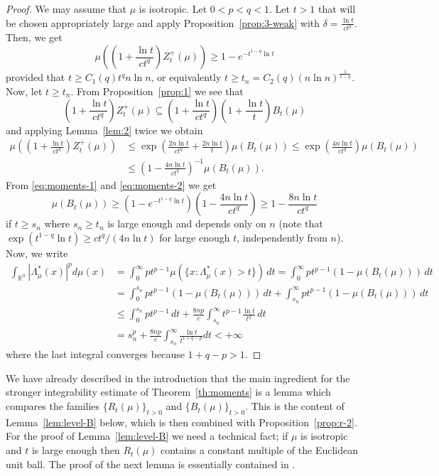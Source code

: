 \documentclass[11pt,leqno]{article}
\theoremstyle{definition}
\theoremstyle{remark}
\numberwithin{equation}{section}
\newcommand{\ls}{\leqslant}
\newcommand{\gr}{\geqslant}
\newcommand{\1}{\textbf{1}}
\begin{document}
\begin{proof}We may assume that $\mu$ is isotropic. Let $0<p<q<1$. Let $t>1$ that will be chosen appropriately large
and apply Proposition~\ref{prop:3-weak} with $\delta =\frac{\ln t}{ct^q}$. Then, we get
\begin{equation}\label{eq:moments-1}\mu \left(\left(1+\frac{\ln t}{ct^q}\right)Z_t^+(\mu )\right)\gr 1-e^{-t^{1-q}\ln t}\end{equation}
provided that $t\gr C_1(q)t^qn\ln n$, or equivalently $t\gr t_n=C_2(q)(n\ln n)^{\frac{1}{1-q}}$.
Now, let $t\gr t_n$. From Proposition~\ref{prop:1} we see that
$$ \left(1+\frac{\ln t}{ct^q}\right)Z_t^+(\mu )\subseteq \left(1+\frac{\ln t}{ct^q}\right)
\left(1+\frac{\ln t}{t}\right)B_t(\mu)$$
and applying Lemma~\ref{lem:2} twice we obtain
\begin{align}\label{eq:moments-2}\mu \left(\left(1+\frac{\ln t}{ct^q}\right)Z_t^+(\mu )\right)
&\ls \exp\left(\frac{2n\ln t}{ct^q}+\frac{2n\ln t}{t}\right)\mu(B_t(\mu))\ls \exp\left(\frac{4n\ln t}{ct^q}\right)\mu(B_t(\mu))\\
\nonumber &\ls \left(1-\frac{4n\ln t}{ct^q}\right)^{-1}\mu(B_t(\mu)).\end{align}
From \eqref{eq:moments-1} and \eqref{eq:moments-2} we get
$$\mu(B_t(\mu))\gr \left(1-e^{-t^{1-q}\ln t}\right)\left(1-\frac{4n\ln t}{ct^q}\right)\gr
1-\frac{8n\ln t}{ct^q}$$
if $t\gr s_n$ where $s_n\gr t_n$ is large enough and depends only on $n$ (note that
$\exp(t^{1-q}\ln t)\gr ct^q/(4n\ln t)$ for large enough $t$, independently from $n$).
Now, we write
\begin{align*}\int_{\mathbb{R}^n}|\Lambda_{\mu}^{\ast}(x)|^pd\mu(x)
&=\int_0^{\infty}pt^{p-1}\mu(\{x:\Lambda_{\mu}^{\ast}(x)>t\})\,dt =\int_0^{\infty}pt^{p-1}(1-\mu(B_t(\mu)))\,dt\\
&=\int_0^{s_n}pt^{p-1}(1-\mu(B_t(\mu)))\,dt+\int_{s_n}^{\infty}pt^{p-1}(1-\mu(B_t(\mu)))\,dt\\
&\ls \int_0^{s_n}pt^{p-1}\,dt+\frac{8np}{c}\int_{s_n}^{\infty}t^{p-1}\frac{\ln t}{t^q}\,dt\\
&=s_n^p+\frac{8np}{c}\int_{s_n}^{\infty}\frac{\ln t}{t^{1+q-p}}dt<+\infty\end{align*}
where the last integral converges because $1+q-p>1$.
\end{proof}

We have already described in the introduction that the main ingredient for the stronger integrability
estimate of Theorem~\ref{th:moments} is a lemma which compares the families $\{R_t(\mu)\}_{t>0}$
and $\{B_t(\mu)\}_{t>0}$. This is the content of Lemma~\ref{lem:level-B} below, which is then combined
with Proposition~\ref{prop:r-2}. For the proof of Lemma~\ref{lem:level-B} we need a technical fact; if $\mu$ is
isotropic and $t$ is large enough then $R_t(\mu)$ contains a constant multiple of the Euclidean unit ball.
The proof of the next lemma is essentially contained in \cite[Lemma~5.4]{Klartag-2007clt}. 
\end{document}

